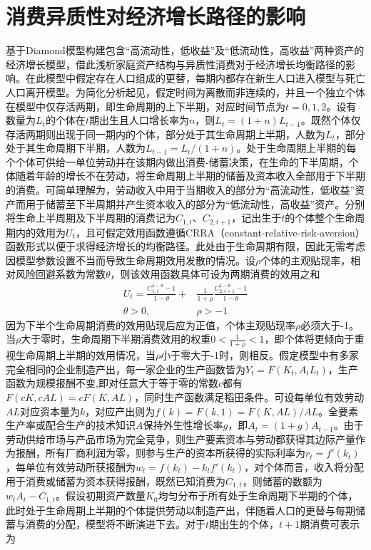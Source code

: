 \documentclass[supercite]{HustGraduPaper}
\begin{document}
    \section{消费异质性对经济增长路径的影响}
    基于Diamond模型构建包含“高流动性，低收益”及“低流动性，高收益”两种资产的经济增长模型，借此浅析家庭资产结构与异质性消费对于经济增长均衡路径的影响。在此模型中假定存在人口组成的更替，每期内都存在新生人口进入模型与死亡人口离开模型。为简化分析起见，假定时间为离散而非连续的，并且一个独立个体在模型中仅存活两期，即生命周期的上下半期，对应时间节点为$t=0,1,2$。设有数量为$L_{t}$的个体在$t$期出生且人口增长率为$n$，则$L_{t}=(1+n)L_{t-1}$。既然个体仅存活两期则出现于同一期内的个体，部分处于其生命周期上半期，人数为$L_{t}$，部分处于其生命周期下半期，人数为$L_{t-1}=L_{t}/(1+n)$。处于生命周期上半期的每个个体可供给一单位劳动并在该期内做出消费-储蓄决策，在生命的下半周期，个体随着年龄的增长不在劳动，将生命周期上半期的储蓄及资本收入全部用于下半期的消费。可简单理解为，劳动收入中用于当期收入的部分为“高流动性，低收益”资产而用于储蓄至下半周期并产生资本收入的部分为“低流动性，高收益”资产。分别将生命上半周期及下半周期的消费记为$C_{1,t}$、$C_{2,t+1}$，记出生于$t$的个体整个生命周期内的效用为$U_{t}$，且可假定效用函数遵循CRRA（constant-relative-risk-aversion）函数形式以便于求得经济增长的均衡路径。此处由于生命周期有限，因此无需考虑因模型参数设置不当而导致生命周期效用发散的情况。设$\rho$个体的主观贴现率，相对风险回避系数为常数$\theta$，则该效用函数具体可设为两期消费的效用之和
    \begin{equation}
    \begin{aligned}
    U_{t}=\frac{C_{1,t}^{1-\theta}-1}{1-\theta}+&\frac{1}{1+\rho}\frac{C_{2,t+1}^{1-\theta}-1}{1-\theta}\\
    \theta>0,\qquad & \rho>-1
    \end{aligned}
    \end{equation}
    因为下半个生命周期消费的效用贴现后应为正值，个体主观贴现率$\rho$必须大于-1。当$\rho$大于零时，生命周期下半期消费效用的权重$0<\frac{1}{1+\rho}<1$，即个体将更倾向于重视生命周期上半期的效用情况，当$\rho$小于零大于-1时，则相反。假定模型中有多家完全相同的企业制造产出，每一家企业的生产函数皆为$Y_{t}=F(K_{t},A_{t}L_{t})$，生产函数为规模报酬不变,即对任意大于等于零的常数$c$都有$F(cK,cAL)=cF(K,AL)$，同时生产函数满足稻田条件。可设每单位有效劳动$AL$对应资本量为$k$，对应产出则为$f(k)=F(k,1)=F(K,AL)/AL$。全要素生产率或配合生产的技术知识$A$保持外生性增长率$g$，即$A_{t}=(1+g)A_{t-1}$。由于劳动供给市场与产品市场为完全竞争，则生产要素资本与劳动都获得其边际产量作为报酬，所有厂商利润为零，则参与生产的资本所获得的实际利率为$r_t=f'(k_t)$，每单位有效劳动所获报酬为$w_t=f(k_t)-k_tf'(k_t)$，对个体而言，收入将分配用于消费或储蓄为资本获得报酬，既然已知消费为$C_{1,t}$，则储蓄的数额为$w_tA_t-C_{1,t}$。假设初期资产数量$K_0$均匀分布于所有处于生命周期下半期的个体，此时处于生命周期上半期的个体提供劳动以制造产出，伴随着人口的更替与每期储蓄与消费的分配，模型将不断演进下去。对于$t$期出生的个体，$t+1$期消费可表示为
\end{document}
